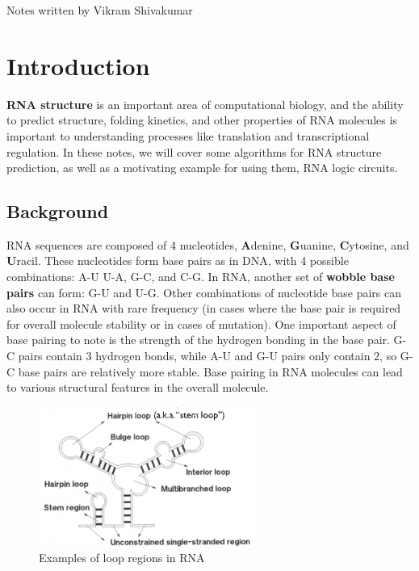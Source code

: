 \documentclass[12pt]{article}
\begin{document}
\thispagestyle{plain}
   \newpage
   \setcounter{page}{1}
   \noindent
   \begin{center}
   \end{center}
   {Notes written by Vikram Shivakumar}
   \vspace*{4mm}


\section{Introduction}
{\bf RNA structure} is an important area of computational biology, and the ability to predict structure, folding kinetics, and other properties of RNA molecules is important to understanding processes like translation and transcriptional regulation. In these notes, we will cover some algorithms for RNA structure prediction, as well as a motivating example for using them, RNA logic circuits.

\subsection{Background}
RNA sequences are composed of 4 nucleotides, {\bf A}denine, {\bf G}uanine, {\bf C}ytosine, and {\bf U}racil. These nucleotides form base pairs as in DNA, with 4 possible combinations: A-U U-A, G-C, and C-G. In RNA, another set of {\bf wobble base pairs} can form: G-U and U-G. Other combinations of nucleotide base pairs can also occur in RNA with rare frequency (in cases where the base pair is required for overall molecule stability or in cases of mutation). One important aspect of base pairing to note is the strength of the hydrogen bonding in the base pair. G-C pairs contain 3 hydrogen bonds, while A-U and G-U pairs only contain 2, so G-C base pairs are relatively more stable.
Base pairing in RNA molecules can lead to various structural features in the overall molecule.
\begin{figure}[h]
    \centering
    \includegraphics[height=1.8in]{rna_loop}
    \caption{Examples of loop regions in RNA}
    \label{fig:loop}
\end{figure}
\end{document}
